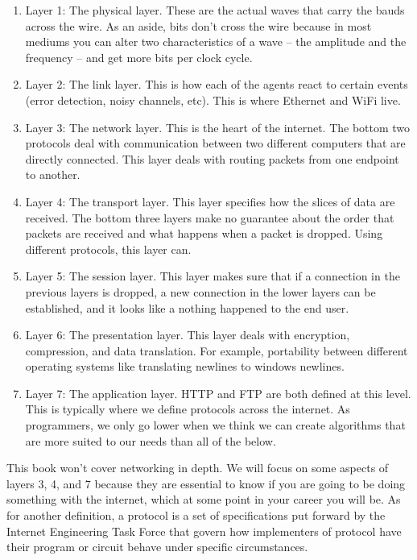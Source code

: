 \begin{enumerate}
\item Layer 1: The physical layer.
  These are the actual waves that carry the bauds across the wire.
  As an aside, bits don't cross the wire because in most mediums you can alter two characteristics of a wave -- the amplitude and the frequency -- and get more bits per clock cycle.

\item Layer 2: The link layer.
  This is how each of the agents react to certain events (error detection, noisy channels, etc).
  This is where \gls{Ethernet} and \gls{WiFi} live.

\item Layer 3: The network layer.
  This is the heart of the internet.
  The bottom two protocols deal with communication between two different computers that are directly connected.
  This layer deals with routing packets from one endpoint to another.

\item Layer 4: The transport layer.
  This layer specifies how the slices of data are received.
  The bottom three layers make no guarantee about the order that packets are received and what happens when a packet is dropped.
  Using different protocols, this layer can.

\item Layer 5: The session layer.
  This layer makes sure that if a connection in the previous layers is dropped, a new connection in the lower layers can be established, and it looks like a nothing happened to the end user.

\item Layer 6: The presentation layer.
  This layer deals with encryption, compression, and data translation.
  For example, portability between different operating systems like translating newlines to windows newlines.

\item Layer 7: The application layer.
  \gls{HTTP} and \gls{FTP} are both defined at this level.
  This is typically where we define protocols across the internet.
  As programmers, we only go lower when we think we can create algorithms that are more suited to our needs than all of the below.

\end{enumerate}

This book won't cover networking in depth.
We will focus on some aspects of layers 3, 4, and 7 because they are essential to know if you are going to be doing something with the internet, which at some point in your career you will be.
As for another definition, a protocol is a set of specifications put forward by the \gls{Internet Engineering Task Force} that govern how implementers of protocol have their program or circuit behave under specific circumstances.

